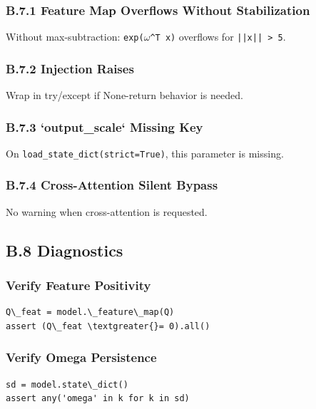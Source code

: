 \subsubsection{B.7.1 Feature Map Overflows Without Stabilization}

Without max-subtraction: \texttt{exp($\omega$^T x)} overflows for \texttt{||x|| \textgreater{} 5}.

\subsubsection{B.7.2 Injection Raises}

Wrap in try/except if None-return behavior is needed.

\subsubsection{B.7.3 `output\_scale` Missing Key}

On \texttt{load\_state\_dict(strict=True)}, this parameter is missing.

\subsubsection{B.7.4 Cross-Attention Silent Bypass}

No warning when cross-attention is requested.

\subsection{B.8 Diagnostics}

\subsubsection{Verify Feature Positivity}

\begin{lstlisting}
Q\_feat = model.\_feature\_map(Q)
assert (Q\_feat \textgreater{}= 0).all()
\end{lstlisting}

\subsubsection{Verify Omega Persistence}

\begin{lstlisting}
sd = model.state\_dict()
assert any('omega' in k for k in sd)
\end{lstlisting}

